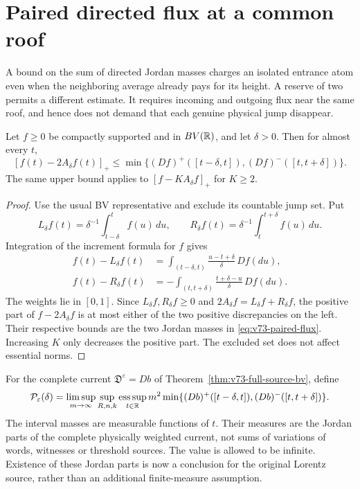 \section{Paired directed flux at a common roof}
\label{sec:v73-paired-flux}
A bound on the sum of directed Jordan masses charges an isolated
entrance atom even when the neighboring average already pays for
its height. A reserve of two permits a different estimate. It
requires incoming and outgoing flux near the same roof, and hence
does not demand that each genuine physical jump disappear.

\begin{lemma}
\label{lem:v73-paired-flux}
Let $f\ge0$ be compactly supported and in $BV(\mathbb R)$, and let
$\delta>0$. Then for almost every $t$,
\begin{equation}\label{eq:v73-paired-flux}
 [f(t)-2A_\delta f(t)]_+
 \le\min\{(Df)^+([t-\delta,t]),(Df)^-([t,t+\delta])\}.
\end{equation}
The same upper bound applies to $[f-KA_\delta f]_+$ for $K\ge2$.
\end{lemma}
\begin{proof}
Use the usual BV representative and exclude its countable jump set.
Put
\[
 L_\delta f(t)=\delta^{-1}\int_{t-\delta}^t f(u)\,du,
 \qquad R_\delta f(t)=\delta^{-1}\int_t^{t+\delta}f(u)\,du.
\]
Integration of the increment formula for $f$ gives
\begin{align*}
 f(t)-L_\delta f(t)
   &=\int_{(t-\delta,t)}\frac{u-t+\delta}{\delta}\,Df(du),\\
 f(t)-R_\delta f(t)
   &=-\int_{(t,t+\delta)}\frac{t+\delta-u}{\delta}\,Df(du).
\end{align*}
The weights lie in $[0,1]$. Since $L_\delta f,R_\delta f\ge0$
and $2A_\delta f=L_\delta f+R_\delta f$, the positive part of
$f-2A_\delta f$ is at most either of the two positive discrepancies
on the left. Their respective bounds are the two Jordan masses in
\eqref{eq:v73-paired-flux}. Increasing $K$ only decreases the
positive part. The excluded set does not affect essential norms.
\end{proof}

For the complete current $\mathfrak D^\varepsilon=Db$ of
Theorem~\ref{thm:v73-full-source-bv}, define
\begin{equation}\label{eq:v73-paired-height}
 \mathcal P_\varepsilon(\delta)
 =\limsup_{m\to\infty}\sup_{R,n,k}
   \operatorname*{ess\,sup}_{t\in\R}m^2
   \min\{(Db)^+([t-\delta,t]),(Db)^-([t,t+\delta])\}.
\end{equation}
The interval masses are measurable functions of $t$. Their measures
are the Jordan parts of the complete physically weighted current,
not sums of variations of words, witnesses or threshold sources.
The value is allowed to be infinite. Existence of these Jordan
parts is now a conclusion for the original Lorentz source, rather
than an additional finite-measure assumption.

